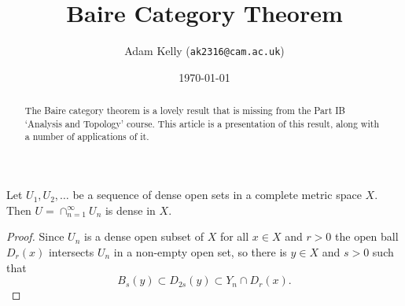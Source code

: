 \documentclass[a4paper]{scrartcl}
\title{Baire Category Theorem}
\author{Adam Kelly (\texttt{ak2316@cam.ac.uk})}
\date{\today}
\begin{document}
\maketitle

\begin{abstract}
    The Baire category theorem is a lovely result that is missing from the Part IB `Analysis and Topology' course. This article is a presentation of this result, along with a number of applications of it.
\end{abstract}

\vspace*{\baselineskip}

\begin{theorem*}
    Let $U_1, U_2, \dots$ be a sequence of dense open sets in a complete metric space $X$. Then $U = \cap_{n = 1}^{\infty} U_n$ is dense in $X$.    
\end{theorem*}
\begin{proof}
    Since $U_n$ is a dense open subset of $X$ for all $x \in X$ and $r > 0$ the open ball $D_r(x)$ intersects $U_n$ in a non-empty open set, so there is $y \in X$ and $s > 0$ such that
    $$
    B_s(y) \subset D_{2s}(y) \subset Y_n \cap D_r(x).
    $$
\end{proof}
\end{document}
